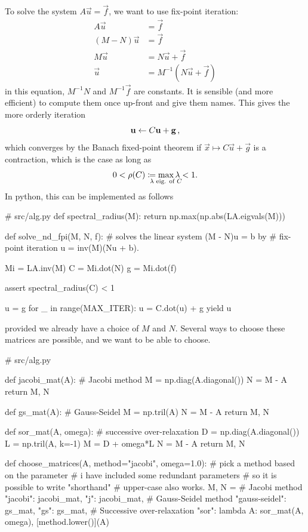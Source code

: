 \documentclass[12pt]{article}
\begin{document}
\begin{multicols}{2}
    To solve the system $A\vec u = \vec f$, we want to use
    fix-point iteration:
    \begin{align*}
        A \vec u &= \vec f \\
        (M - N) \vec u &= \vec f \\
        M \vec u &= N \vec u + \vec f \\
        \vec u &= M^{-1} (N \vec u + \vec f)
    \end{align*}
    in this equation, $M^{-1}N$ and $M^{-1}\vec f$ are constants.
    It is sensible (and more efficient) to compute them once up-front and give them
    names.
    This gives the more orderly iteration
    \[
        \vec u \leftarrow C\vec u + \vec g \,\text,
    \]
    which converges by the Banach fixed-point theorem if
    $\vec x \mapsto C\vec u + \vec g$ is a contraction,
    which is the case as long as
    \[
        0 < \rho(C) \coloneqq \smashoperator{
            \max_{\lambda \text{ eig. of } C}
        } \lambda < 1
        \text.
    \]
    In python, this can be implemented as follows
    \begin{python}[
        caption={N-dimensional solver.}
    ]
# src/alg.py
def spectral_radius(M):
    return np.max(np.abs(LA.eigvals(M)))

def solve_nd_fpi(M, N, f):
    # solves the linear system (M - N)u = b by
    # fix-point iteration u = inv(M)(Nu + b).

    Mi = LA.inv(M)
    C  = Mi.dot(N)
    g  = Mi.dot(f)

    assert spectral_radius(C) < 1

    u = g
    for _ in range(MAX_ITER):
        u = C.dot(u) + g
        yield u
    \end{python}
    provided we already have a choice of $M$ and $N$.
    Several ways to choose these matrices are possible,
    and we want to be able to choose.
    \begin{python}[
        caption={Argument-``parser'' and choice of $M$, $N$.}
    ]
# src/alg.py

def jacobi_mat(A):
    # Jacobi method
    M = np.diag(A.diagonal())
    N = M - A
    return M, N

def gs_mat(A):
    # Gauss-Seidel
    M = np.tril(A)
    N = M - A
    return M, N

def sor_mat(A, omega):
    # successive over-relaxation
    D = np.diag(A.diagonal())
    L = np.tril(A, k=-1)
    M = D + omega*L
    N = M - A
    return M, N

def choose_matrices(A, method="jacobi", omega=1.0):
    # pick a method based on the parameter
    # i have included some redundant parameters
    # so it is possible to write "shorthand"
    # upper-case also works.
    M, N = {
        # Jacobi method
        "jacobi":        jacobi_mat,
        "j":             jacobi_mat,
        # Gauss-Seidel method
        "gauss-seidel":  gs_mat,
        "gs":            gs_mat,
        # Successive over-relaxation
        "sor": lambda A: sor_mat(A, omega),
    }[method.lower()](A)


\end{python}
\end{multicols}
\end{document}
